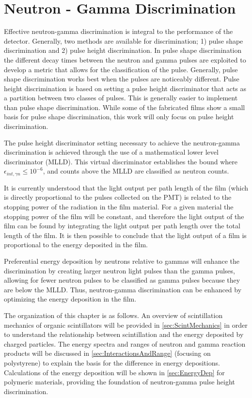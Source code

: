 \chapter{Neutron - Gamma Discrimination}
\label{chap:SecElectron}

Effective neutron-gamma discrimination is integral to the performance of the detector.
Generally, two methods are available for discrimination; 1) pulse shape discrimination and 2) pulse height discrimination.
In pulse shape discrimination the different decay times between the neutron and gamma pulses are exploited to develop a metric that allows for the classification of the pulse.
Generally, pulse shape discrimination works best when the pulses are noticeably different.
Pulse height discrimination is based on setting a pulse height discriminator that acts as a partition between two classes of pulses.
This is generally easier to implement than pulse shape discrimination.
While some of the fabricated films show a small basis for pulse shape discrimination, this work will only focus on pulse height discrimination.

The pulse height discriminator setting necessary to achieve the neutron-gamma discrimination is achieved through the use of a mathematical lower level discriminator (MLLD).
This virtual discriminator establishes the bound where $\epsilon_{int,\gamma n}\leq 10^{-6}$, and counts above the MLLD are classified as neutron counts. 

It is currently understood that the light output per path length of the film (which is directly proportional to the pulses collected on the PMT) is related to the stopping power of the radiation in the film material.
For a given material the stopping power of the film will be constant, and therefore the light output of the film can be found by integrating the light output per path length over the total length of the film.
It is then possible to conclude that the light output of a film is proportional to the energy deposited in the film.

Preferential energy deposition by neutrons relative to gammas will enhance the discrimination by creating larger neutron light pulses than the gamma pulses, allowing for fewer neutron pulses to be classified as gamma pulses because they are below the MLLD.
Thus, neutron-gamma discrimination can be enhanced by optimizing the energy deposition in the film. 

The organization of this chapter is as follows.
An overview of scintillation mechanics of organic scintillators will be provided in \autoref{sec:ScintMechanics} in order to understand the relationship between scintillation and the energy deposited by charged particles.
The energy spectra and ranges of neutron and gamma reaction products will be discussed in \autoref{sec:InteractionsAndRange} (focusing on polystyrene) to explain the basis for the difference in energy depositions. 
Calculations of the energy deposition will be shown in \autoref{sec:EnergyDep} for polymeric materials, providing the foundation of neutron-gamma pulse height discrimination.

